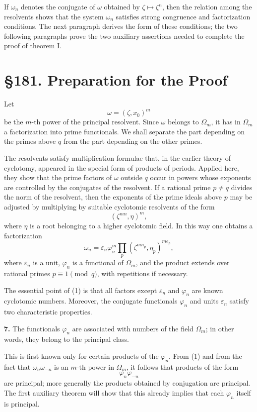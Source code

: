 \documentclass[11pt,a4paper]{book}
\newcommand{\webersection}[2]{\clearpage\section*{\S #1. #2}}
\newcommand{\zetaS}{\zeta}
\providecommand{\Om}{\Omega_m}
\begin{document}
If \(\omega_n\) denotes the conjugate of \(\omega\) obtained by \(\zetaS\mapsto\zetaS^n\), then the relation among the resolvents shows that the system \(\omega_n\) satisfies strong congruence and factorization conditions.  The next paragraph derives the form of these conditions; the two following paragraphs prove the two auxiliary assertions needed to complete the proof of theorem I.

\webersection{181}{Preparation for the Proof}

Let
\[
  \omega=(\zetaS,x_0)^m
\]
be the \(m\)-th power of the principal resolvent.  Since \(\omega\) belongs to \(\Om\), it has in \(\Om\) a factorization into prime functionals.  We shall separate the part depending on the primes above \(q\) from the part depending on the other primes.

The resolvents satisfy multiplication formulae that, in the earlier theory of cyclotomy, appeared in the special form of products of periods.  Applied here, they show that the prime factors of \(\omega\) outside \(q\) occur in powers whose exponents are controlled by the conjugates of the resolvent.  If a rational prime \(p\ne q\) divides the norm of the resolvent, then the exponents of the prime ideals above \(p\) may be adjusted by multiplying by suitable cyclotomic resolvents of the form
\[
  (\zetaS^{mn},\eta)^m,
\]
where \(\eta\) is a root belonging to a higher cyclotomic field.  In this way one obtains a factorization
\[
  \omega_n=\varepsilon_n\varphi_n^m
       \prod_p (\zetaS^{m n_p},\eta_p)^{m e_p},
\tag{1}
\]
where \(\varepsilon_n\) is a unit, \(\varphi_n\) is a functional of \(\Om\), and the product extends over rational primes \(p\equiv1\pmod q\), with repetitions if necessary.

The essential point of (1) is that all factors except \(\varepsilon_n\) and \(\varphi_n\) are known cyclotomic numbers.  Moreover, the conjugate functionals \(\varphi_n\) and units \(\varepsilon_n\) satisfy two characteristic properties.

\textbf{7.} The functionals \(\varphi_n\) are associated with numbers of the field \(\Om\); in other words, they belong to the principal class.

This is first known only for certain products of the \(\varphi_n\).  From (1) and from the fact that \(\omega_n\omega_{-n}\) is an \(m\)-th power in \(\Om\), it follows that products of the form
\[
  \varphi_n\varphi_{-n}
\]
are principal; more generally the products obtained by conjugation are principal.  The first auxiliary theorem will show that this already implies that each \(\varphi_n\) itself is principal.
\end{document}
